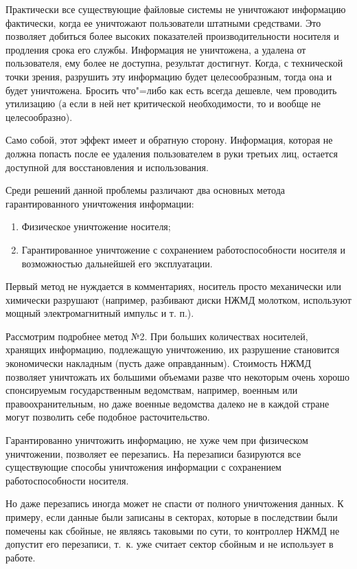 \documentclass[10pt, a5paper]{article}
\begin{document}
Практически все существующие файловые системы не уничтожают информацию фактически, когда ее уничтожают пользователи  штатными средствами. Это позволяет добиться более высоких показателей производительности носителя и продления срока его службы. Информация не уничтожена, а удалена от пользователя, ему более не доступна, результат достигнут. Когда, с технической точки зрения, разрушить эту информацию будет целесообразным, тогда она и будет уничтожена. Бросить что"=либо как есть всегда дешевле, чем проводить утилизацию (а если в ней нет критической необходимости, то и вообще не целесообразно).

Само собой, этот эффект имеет и обратную сторону.  Информация, которая не должна попасть после ее удаления пользователем в руки третьих лиц, остается доступной для восстановления и использования.

Среди решений данной проблемы различают два основных метода гарантированного уничтожения информации:
\begin{enumerate}
      \item Физическое уничтожение носителя;
      \item Гарантированное уничтожение с сохранением работоспособности носителя и возможностью дальнейшей его эксплуатации.
\end{enumerate}

Первый метод не нуждается в комментариях, носитель просто механически или химически разрушают (например, разбивают диски НЖМД молотком, используют мощный электромагнитный импульс и т. п.).

Рассмотрим подробнее метод №2. При больших количествах носителей, хранящих информацию, подлежащую уничтожению, их разрушение становится экономически накладным (пусть даже \linebreak оправданным). Стоимость НЖМД позволяет уничтожать их большими объемами разве что некоторым очень хорошо спонсируемым государственным ведомствам, например, военным или правоохранительным, но даже военные ведомства далеко не в каждой стране могут позволить себе подобное расточительство.

Гарантированно уничтожить информацию, не хуже чем при физическом уничтожении, позволяет ее перезапись. На перезаписи базируются все существующие способы уничтожения информации с сохранением работоспособности носителя.

Но даже перезапись иногда может не спасти от полного уничтожения данных. К примеру, если данные были записаны в секторах, которые в последствии были помечены как сбойные, не являясь таковыми по сути, то контроллер НЖМД не допустит его перезаписи, т.~к. уже считает сектор сбойным и не использует в работе.
\end{document}
